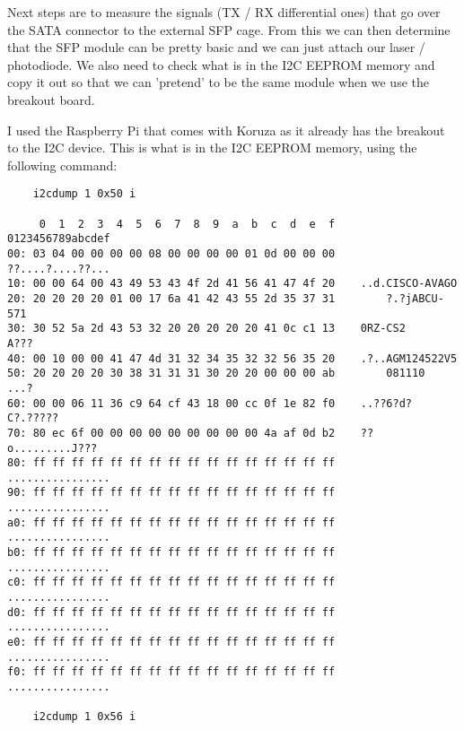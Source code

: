 Next steps are to measure the signals (TX / RX differential ones) that go over
the SATA connector to the external \ac{SFP} cage. From this we can then
determine that the \ac{SFP} module can be pretty basic and we can just attach
our laser / photodiode. We also need to check what is in the \ac{I2C} EEPROM
memory and copy it out so that we can 'pretend' to be the same module when
we use the breakout board.

I used the Raspberry Pi that comes with Koruza as it already has the breakout
to the I2C device. This is what is in the I2C EEPROM memory, using the
following command:

\begin{lstlisting}
	i2cdump 1 0x50 i

     0  1  2  3  4  5  6  7  8  9  a  b  c  d  e  f    0123456789abcdef
00: 03 04 00 00 00 00 08 00 00 00 00 01 0d 00 00 00    ??....?....??...
10: 00 00 64 00 43 49 53 43 4f 2d 41 56 41 47 4f 20    ..d.CISCO-AVAGO 
20: 20 20 20 20 01 00 17 6a 41 42 43 55 2d 35 37 31        ?.?jABCU-571
30: 30 52 5a 2d 43 53 32 20 20 20 20 20 41 0c c1 13    0RZ-CS2     A???
40: 00 10 00 00 41 47 4d 31 32 34 35 32 32 56 35 20    .?..AGM124522V5 
50: 20 20 20 20 30 38 31 31 31 30 20 20 00 00 00 ab        081110  ...?
60: 00 00 06 11 36 c9 64 cf 43 18 00 cc 0f 1e 82 f0    ..??6?d?C?.?????
70: 80 ec 6f 00 00 00 00 00 00 00 00 00 4a af 0d b2    ??o.........J???
80: ff ff ff ff ff ff ff ff ff ff ff ff ff ff ff ff    ................
90: ff ff ff ff ff ff ff ff ff ff ff ff ff ff ff ff    ................
a0: ff ff ff ff ff ff ff ff ff ff ff ff ff ff ff ff    ................
b0: ff ff ff ff ff ff ff ff ff ff ff ff ff ff ff ff    ................
c0: ff ff ff ff ff ff ff ff ff ff ff ff ff ff ff ff    ................
d0: ff ff ff ff ff ff ff ff ff ff ff ff ff ff ff ff    ................
e0: ff ff ff ff ff ff ff ff ff ff ff ff ff ff ff ff    ................
f0: ff ff ff ff ff ff ff ff ff ff ff ff ff ff ff ff    ................

	i2cdump 1 0x56 i


\end{lstlisting}
